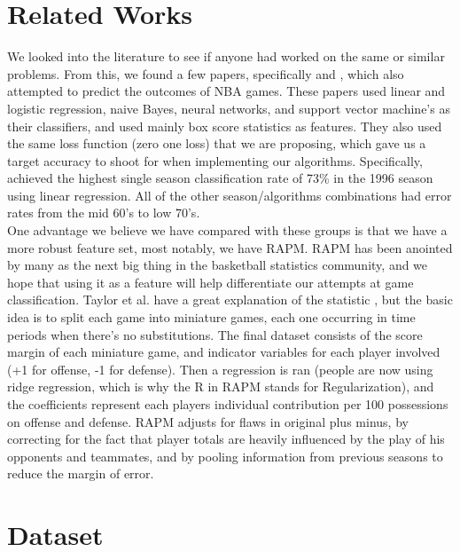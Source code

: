 \documentclass{article} %
\begin{document}
\section{Related Works}
	We looked into the literature to see if anyone had worked on the same or similar problems. From this, we found a few papers, specifically \cite{nba_oracle} and \cite{data_mining}, which also attempted to predict the outcomes of NBA games. These papers used linear and logistic regression, naive Bayes, neural networks, and support vector machine's as their classifiers, and used mainly box score statistics as features. They also used the same loss function (zero one loss) that we are proposing, which gave us a target accuracy to shoot for when implementing our algorithms. Specifically, \cite{nba_oracle} achieved the highest single season classification rate of 73\% in the 1996 season using linear regression. All of the other season/algorithms combinations had error rates from the mid 60's to low 70's. \\

	One advantage we believe we have compared with these groups is that we have a more robust feature set, most notably, we have RAPM. RAPM has been anointed by many as the next big thing \cite{bigrpm} in the basketball statistics community, and we hope that using it as a feature will help differentiate our attempts at game classification. Taylor et al. have a great explanation of the statistic \cite{rpm}, but the basic idea is to split each game into miniature games, each one occurring in time periods when there's no substitutions. The final dataset consists of the score margin of each miniature game, and indicator variables for each player involved (+1 for offense, -1 for defense). Then a regression is ran (people are now using ridge regression, which is why the R in RAPM stands for Regularization), and the coefficients represent each players individual contribution per 100 possessions on offense and defense. RAPM adjusts for flaws in original plus minus, by correcting for the fact that player totals are heavily influenced by the play of his opponents and teammates, and by pooling information from previous seasons to reduce the margin of error. 

\section{Dataset}
\end{document}
